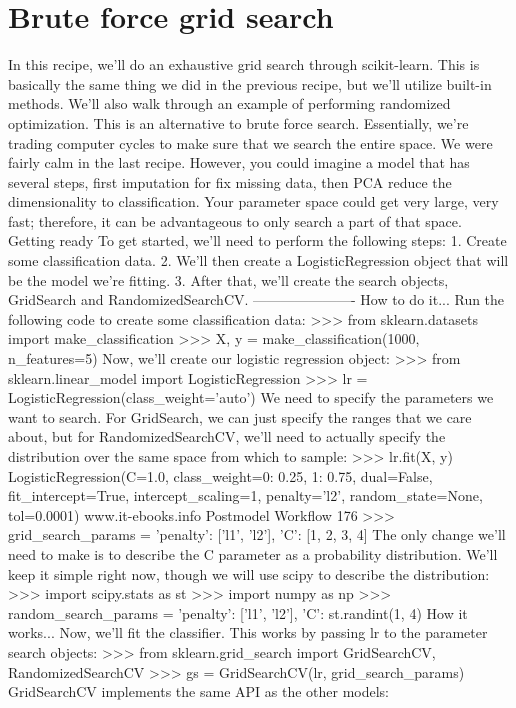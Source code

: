 \section{Brute force grid search}
In this recipe, we'll do an exhaustive grid search through scikit-learn. This is basically the same
thing we did in the previous recipe, but we'll utilize built-in methods.
We'll also walk through an example of performing randomized optimization. This is an alternative
to brute force search. Essentially, we're trading computer cycles to make sure that we search
the entire space. We were fairly calm in the last recipe. However, you could imagine a model
that has several steps, first imputation for fix missing data, then PCA reduce the dimensionality
to classification. Your parameter space could get very large, very fast; therefore, it can be
advantageous to only search a part of that space.
Getting ready
To get started, we'll need to perform the following steps:
1. Create some classification data.
2. We'll then create a LogisticRegression object that will be the model we're fitting.
3. After that, we'll create the search objects, GridSearch and RandomizedSearchCV.
---------------------- %
How to do it...
Run the following code to create some classification data:
>>> from sklearn.datasets import make_classification
>>> X, y = make_classification(1000, n_features=5)
Now, we'll create our logistic regression object:
>>> from sklearn.linear_model import LogisticRegression
>>> lr = LogisticRegression(class_weight='auto')
We need to specify the parameters we want to search. For GridSearch, we can just specify
the ranges that we care about, but for RandomizedSearchCV, we'll need to actually specify
the distribution over the same space from which to sample:
>>> lr.fit(X, y)
LogisticRegression(C=1.0, class_weight={0: 0.25, 1: 0.75}, dual=False,
fit_intercept=True, intercept_scaling=1,
penalty='l2', random_state=None, tol=0.0001)
www.it-ebooks.info
Postmodel Workflow
176
>>> grid_search_params = {'penalty': ['l1', 'l2'],
'C': [1, 2, 3, 4]}
The only change we'll need to make is to describe the C parameter as a probability distribution.
We'll keep it simple right now, though we will use scipy to describe the distribution:
>>> import scipy.stats as st
>>> import numpy as np
>>> random_search_params = {'penalty': ['l1', 'l2'],
'C': st.randint(1, 4)}
How it works...
Now, we'll fit the classifier. This works by passing lr to the parameter search objects:
>>> from sklearn.grid_search import GridSearchCV, RandomizedSearchCV
>>> gs = GridSearchCV(lr, grid_search_params)
GridSearchCV implements the same API as the other models:
